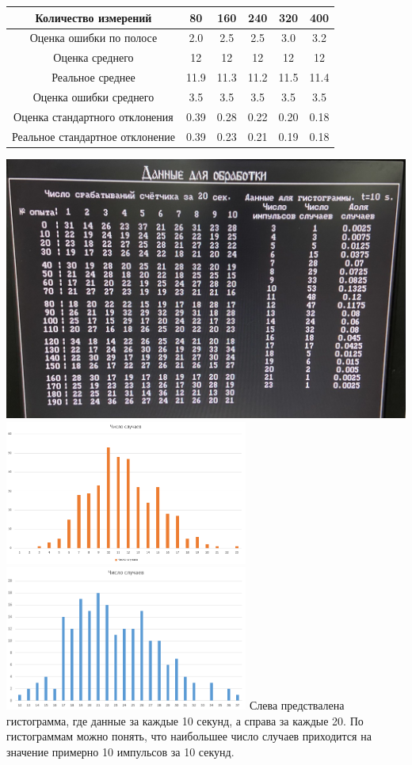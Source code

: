 	
		\begin{center}
		
			\begin{tabular}{|c|c|c|c|c|c|}
			\hline
				Количество измерений & 80 & 160 & 240 & 320 & 400  \\ \hline
				Оценка ошибки по полосе & 2.0 & 2.5 & 2.5 & 3.0 & 3.2   \\ \hline
				Оценка среднего & 12 & 12 & 12 & 12 & 12   \\ \hline
			    Реальное среднее & 11.9 & 11.3 & 11.2 & 11.5 & 11.4   \\  \hline
				Оценка ошибки среднего & 3.5 & 3.5 & 3.5 & 3.5 & 3.5  \\ \hline
				Оценка стандартного отклонения & 0.39 & 0.28 & 0.22 & 0.20 & 0.18  \\  \hline
				Реальное стандартное отклонение & 0.39 & 0.23 & 0.21 & 0.19 & 0.18   \\ \hline
			
			\end{tabular}
		\includegraphics[width=14cm ]{7}
		\includegraphics[width=8cm ]{graph1}
		\includegraphics[width=8cm ]{graph2}
		Слева предствалена гистограмма, где данные за каждые 10 секунд, а справа за каждые 20. По гистограммам можно понять, что наибольшее число случаев приходится на значение примерно 10 импульсов за 10 секунд.
		\end{center}
	

